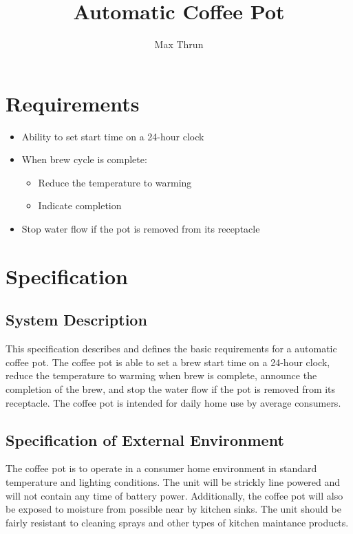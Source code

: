 \documentclass[12pt]{article}
\title{Automatic Coffee Pot}
\author{Max Thrun}
\begin{document}
\maketitle


\section{Requirements}
\begin{itemize}
    \item Ability to set start time on a 24-hour clock
    \item When brew cycle is complete:
        \begin{itemize}
                \item Reduce the temperature to warming
                \item Indicate completion
        \end{itemize}
    \item Stop water flow if the pot is removed from its receptacle
\end{itemize}


\section{Specification}

\subsection{System Description}
This specification describes and defines the basic requirements for a automatic coffee pot. The coffee pot is able to set a brew start time on a 24-hour clock, reduce the temperature to warming when brew is complete, announce the completion of the brew, and stop the water flow if the pot is removed from its receptacle. The coffee pot is intended for daily home use by average consumers.

\subsection{Specification of External Environment}
The coffee pot is to operate in a consumer home environment in standard temperature and lighting conditions. The unit will be strickly line powered and will not contain any time of battery power. Additionally, the coffee pot will also be exposed to moisture from possible near by kitchen sinks. The unit should be fairly resistant to cleaning sprays and other types of kitchen maintance products.
\end{document}
